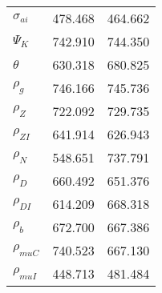 \begin{center}
\begin{longtable}{lcc}
$ {\sigma_{ai}}        $	 & 	     478.468	 & 	     464.662 \\ 
$ {\Psi_{K}}           $	 & 	     742.910	 & 	     744.350 \\ 
$ {\theta}             $	 & 	     630.318	 & 	     680.825 \\ 
$ {\rho_g}             $	 & 	     746.166	 & 	     745.736 \\ 
$ {\rho_Z}             $	 & 	     722.092	 & 	     729.735 \\ 
$ {\rho_{ZI}}          $	 & 	     641.914	 & 	     626.943 \\ 
$ {\rho_N}             $	 & 	     548.651	 & 	     737.791 \\ 
$ {\rho_D}             $	 & 	     660.492	 & 	     651.376 \\ 
$ {\rho_{DI}}          $	 & 	     614.209	 & 	     668.318 \\ 
$ {\rho_b}             $	 & 	     672.700	 & 	     667.386 \\ 
$ {\rho_{muC}}         $	 & 	     740.523	 & 	     667.130 \\ 
$ {\rho_{muI}}         $	 & 	     448.713	 & 	     481.484 \\ 
\end{longtable}
 \end{center}
